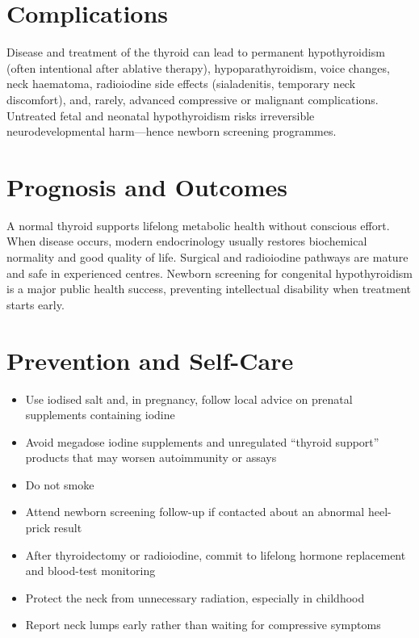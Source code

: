 \section*{Complications}
Disease and treatment of the thyroid can lead to permanent hypothyroidism (often intentional after ablative therapy), hypoparathyroidism, voice changes, neck haematoma, radioiodine side effects (sialadenitis, temporary neck discomfort), and, rarely, advanced compressive or malignant complications. Untreated fetal and neonatal hypothyroidism risks irreversible neurodevelopmental harm---hence newborn screening programmes.

\section*{Prognosis and Outcomes}
A normal thyroid supports lifelong metabolic health without conscious effort. When disease occurs, modern endocrinology usually restores biochemical normality and good quality of life. Surgical and radioiodine pathways are mature and safe in experienced centres. Newborn screening for congenital hypothyroidism is a major public health success, preventing intellectual disability when treatment starts early.

\section*{Prevention and Self-Care}
\begin{itemize}
    \item Use iodised salt and, in pregnancy, follow local advice on prenatal supplements containing iodine
    \item Avoid megadose iodine supplements and unregulated ``thyroid support'' products that may worsen autoimmunity or assays
    \item Do not smoke
    \item Attend newborn screening follow-up if contacted about an abnormal heel-prick result
    \item After thyroidectomy or radioiodine, commit to lifelong hormone replacement and blood-test monitoring
    \item Protect the neck from unnecessary radiation, especially in childhood
    \item Report neck lumps early rather than waiting for compressive symptoms
\end{itemize}

